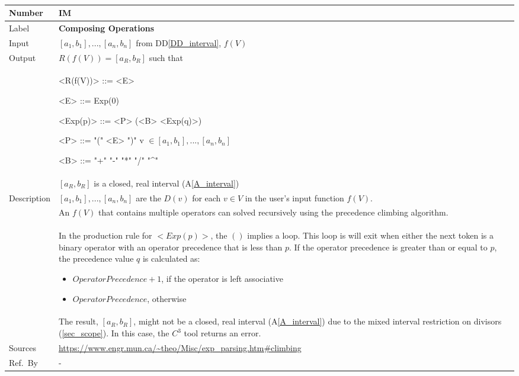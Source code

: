 \documentclass[12pt]{article}
\newcommand{\colAwidth}{0.13\textwidth}
\newcommand{\colBwidth}{0.82\textwidth}
\newcommand{\ddref}[1]{DD\ref{#1}}
\newcommand{\aref}[1]{A\ref{#1}}
\newcounter{instnum} %
\newcommand{\prognameAbbrv}{$C^{3}$}
\begin{document}
~\newline

\noindent
\begin{minipage}{\textwidth}
	\renewcommand*{\arraystretch}{1.5}
	\begin{tabular}{| p{\colAwidth} | p{\colBwidth}|}
		\hline
		\rowcolor[gray]{0.9}
		Number& IM{instnum}\theinstnum \label{I_compose}\\
		\hline
		Label& \bf Composing Operations\\
		\hline
		Input&$[a_{1}, b_{1}], ..., [a_{n}, b_{n}]$ from \ddref{DD_interval}, 
		$f(V)$\\
		\hline
		Output&$R(f(V)) = [a_{R}, b_{R}]$ such that\\
		& 
		\setlength{\grammarparsep}{5pt plus 1pt minus 1pt} 
		\setlength{\grammarindent}{6em} %
		
		\begin{grammar}
			<R(f(V))> ::= <E>
			
			<E> ::= Exp(0) 
			
			<Exp(p)> ::= <P> (<B> <Exp(q)>)
			
			<P> ::= "(" <E> ")" 
			\alt v $\in [a_{1}, b_{1}], ..., [a_{n}, b_{n}]$
			
			<B> ::= "+"
			\alt "-"
			\alt "*"
			\alt "/"
			\alt "\textasciicircum"
			
		\end{grammar}\\
		&$[a_{R}, b_{R}]$ is a closed, real interval (\aref{A_interval})\\
		\hline
		Description&$[a_{1}, b_{1}], ..., [a_{n}, b_{n}]$ are the $D(v)$ for 
		each $v \in V$ in the user's input function $f(V)$. \\
		&An $f(V)$ that contains multiple operators can solved recursively 
		using the precedence climbing algorithm. \\
		&In the production rule for $<Exp(p)>$, the $()$ implies a loop. This 
		loop is will exit when either the next token is a binary operator with 
		an operator precedence that is less than $p$. If the operator 
		precedence is greater than or equal to $p$, the precedence value $q$ is 
		calculated as: 
		\begin{itemize}
			\item $Operator Precedence + 1$, if the operator is left associative
			\item $Operator Precedence$, otherwise
		\end{itemize}
		\\
		&The result, $[a_{R}, b_{R}]$, might not be a closed, real interval 
		(\aref{A_interval}) due to the mixed interval restriction on divisors 
		(\ref{sec_scope}). In this case, the \prognameAbbrv{} tool returns an 
		error.
		\\
		\hline
		Sources& 
		\url{https://www.engr.mun.ca/~theo/Misc/exp_parsing.htm#climbing} \\
		\hline
		Ref.\ By & -\\
		\hline
	\end{tabular}
\end{minipage}\\
\end{document}
